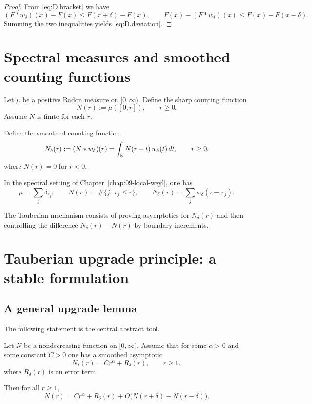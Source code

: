 \begin{proof}
From \eqref{eq:D.bracket} we have
\[
(F*w_\delta)(x)-F(x)
\le
F(x+\delta)-F(x),
\qquad
F(x)-(F*w_\delta)(x)
\le
F(x)-F(x-\delta).
\]
Summing the two inequalities yields \eqref{eq:D.deviation}.
\end{proof}

\section{Spectral measures and smoothed counting functions}
\label{sec:D.spectral}

Let $\mu$ be a positive Radon measure on $[0,\infty)$.
Define the sharp counting function
\begin{equation}
\label{eq:D.sharp-count}
N(r):=\mu([0,r]),
\qquad r\ge 0.
\end{equation}
Assume $N$ is finite for each $r$.

Define the smoothed counting function
\begin{equation}
\label{eq:D.smoothed-count}
N_\delta(r)
:=
(N*w_\delta)(r)
=
\int_{\mathbb{R}} N(r-t)\,w_\delta(t)\,dt,
\qquad r\ge 0,
\end{equation}
where $N(r)=0$ for $r<0$.

In the spectral setting of Chapter~\ref{chap:09-local-weyl}, one has
\[
\mu=\sum_j \delta_{r_j},
\qquad
N(r)=\#\{j:\ r_j\le r\},
\qquad
N_\delta(r)=\sum_j w_\delta(r-r_j).
\]

The Tauberian mechanism consists of proving asymptotics for $N_\delta(r)$ and then controlling the difference
$N_\delta(r)-N(r)$ by boundary increments.

\section{Tauberian upgrade principle: a stable formulation}
\label{sec:D.tauberian-upgrade}

\subsection{A general upgrade lemma}
\label{subsec:D.upgrade-lemma}

The following statement is the central abstract tool.

\begin{lemma}
\label{lem:D.upgrade}
Let $N$ be a nondecreasing function on $[0,\infty)$.
Assume that for some $\alpha>0$ and some constant $C>0$ one has a smoothed asymptotic
\begin{equation}
\label{eq:D.smoothed-asymptotic}
N_\delta(r)
=
C r^\alpha
+
R_\delta(r),
\qquad r\ge 1,
\end{equation}
where $R_\delta(r)$ is an error term.

Then for all $r\ge 1$,
\begin{equation}
\label{eq:D.sharp-recovery}
N(r)
=
C r^\alpha
+
R_\delta(r)
+
O\!\bigl(N(r+\delta)-N(r-\delta)\bigr).
\end{equation}
\end{lemma}

